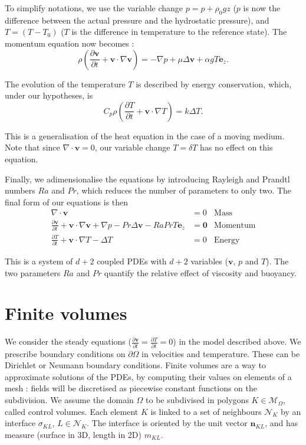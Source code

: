 \documentclass[12pt]{article}
\newcommand{\vb}[1]{\ensuremath{\boldsymbol #1}}
\begin{document}
To simplify notations, we use the variable change $p = p + \rho_0 g z$
($p$ is now the difference between the actual pressure and the
hydrostatic pressure), and $T = (T - T_0)$ ($T$ is the difference in
temperature to the reference state). The momentum equation now becomes
:
\begin{equation}
  \label{ns-mom}
  \rho \left(\frac{\partial \vb{v}}{\partial t} + \vb{v} \cdot
    \nabla \vb{v}\right) = -\nabla p + \mu \Delta \vb{v} + \alpha g
  T \vb{e_z}.
\end{equation}

The evolution of the temperature $T$ is described by energy
conservation, which, under our hypotheses, is
\begin{equation}
  C_p \rho \left(\frac{\partial T}{\partial t} + \vb{v} \cdot \nabla T\right) = k \Delta T.
\end{equation}

This is a generalisation of the heat equation in the case of a moving
medium. Note that since $\nabla \cdot \vb{v} = 0$, our variable change
$T = \delta T$ has no effect on this equation.

Finally, we adimensionalise the equations by introducing Rayleigh and
Prandtl numbers $Ra$ and $Pr$, which reduces the number of parameters
to only two. The final form of our equations is then
\begin{align}
  \label{b-mass}
  \nabla \cdot \vb{v} &= 0& \text{Mass}\\
  \label{b-mom}
  \frac{\partial \vb{v}}{\partial t} + \vb{v} \cdot
  \nabla \vb{v} +\nabla p - Pr \Delta \vb{v} - Ra Pr T
  \vb{e_z} &= \vb{0}& \text{Momentum}\\
  \label{b-ene}
  \frac{\partial T}{\partial t} + \vb{v} \cdot \nabla T - \Delta
  T&=0& \text{Energy}
\end{align}

This is a system of $d + 2$ coupled PDEs with $d+2$ variables
($\vb{v}$, $p$ and $T$). The two parameters $Ra$ and $Pr$ quantify the
relative effect of viscosity and buoyancy.

\section{Finite volumes}
We consider the steady equations ($\frac{\partial \vb{v}}{\partial t}
= \frac{\partial T}{\partial t} = 0$) in the model described above. We
prescribe boundary conditions on $\partial \Omega$ in velocities and
temperature. These can be Dirichlet or Neumann boundary
conditions. Finite volumes are a way to approximate solutions of the
PDEs, by computing their values on elements of a mesh : fields will be
discretised as piecewise constant functions on the subdivision. We
assume the domain $\Omega$ to be subdivised in polygons $K \in
\mathcal{M}_\Omega$, called control volumes. Each element $K$ is
linked to a set of neighbours $\mathcal{N}_K$ by an interface
$\sigma_{KL}$, $L \in \mathcal N_K$. The interface is oriented by the
unit vector $\vb{n}_{KL}$, and has measure (surface in 3D, length in
2D) $m_{KL}$.
\end{document}
